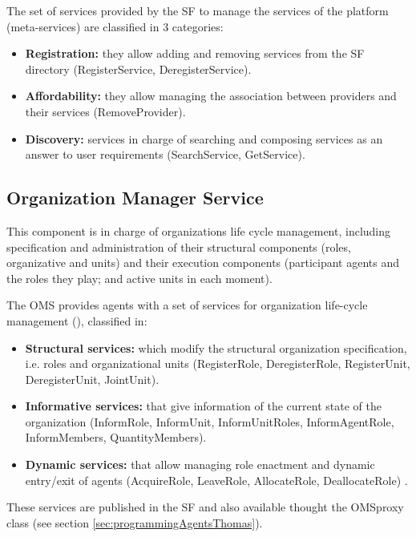 The set of services provided by the SF to manage the services of the platform (meta-services) are classified in 3 categories:

\begin{itemize}
	\item \textbf{Registration:} they allow adding and removing services from the SF directory (RegisterService, DeregisterService).
	\item \textbf{Affordability:} they allow managing the association between providers and their services (RemoveProvider).
	\item \textbf{Discovery:} services in charge of searching and composing services as an answer to user requirements (SearchService, GetService).
\end{itemize}

\subsection{Organization Manager Service}
This component is in charge of organizations life cycle management, including specification and administration of their structural components (roles, organizative and units) and their execution components (participant agents and the roles they play; and active units in each moment).

The OMS provides agents with a set of services for organization life-cycle management (\cite{DelVal09}), classified in:

\begin{itemize}
	\item \textbf{Structural services:} which modify the structural organization specification, i.e. roles and organizational units (RegisterRole, DeregisterRole, RegisterUnit, DeregisterUnit, JointUnit).
	\item \textbf{Informative services:} that give information of the current state of the organization (InformRole, InformUnit, InformUnitRoles, InformAgentRole, InformMembers, QuantityMembers).
	\item \textbf{Dynamic services:} that allow managing role enactment and dynamic entry/exit of agents (AcquireRole, LeaveRole, AllocateRole, DeallocateRole) .
\end{itemize}

These services are  published in the SF and also available thought the OMSproxy class (see section \ref{sec:programmingAgentsThomas}).


